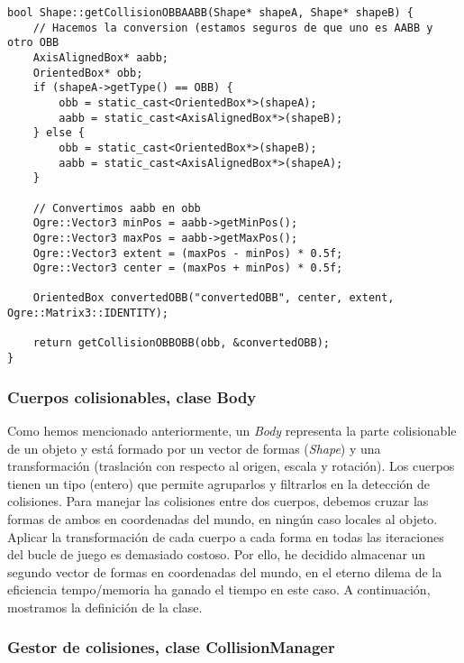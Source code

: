 
\begin{lstlisting}[style=C++]
bool Shape::getCollisionOBBAABB(Shape* shapeA, Shape* shapeB) {
    // Hacemos la conversion (estamos seguros de que uno es AABB y otro OBB
    AxisAlignedBox* aabb;
    OrientedBox* obb;
    if (shapeA->getType() == OBB) {
        obb = static_cast<OrientedBox*>(shapeA);
        aabb = static_cast<AxisAlignedBox*>(shapeB);
    } else {
        obb = static_cast<OrientedBox*>(shapeB);
        aabb = static_cast<AxisAlignedBox*>(shapeA);
    }

    // Convertimos aabb en obb
    Ogre::Vector3 minPos = aabb->getMinPos();
    Ogre::Vector3 maxPos = aabb->getMaxPos();
    Ogre::Vector3 extent = (maxPos - minPos) * 0.5f;
    Ogre::Vector3 center = (maxPos + minPos) * 0.5f;

    OrientedBox convertedOBB("convertedOBB", center, extent, Ogre::Matrix3::IDENTITY);

    return getCollisionOBBOBB(obb, &convertedOBB);
}
\end{lstlisting}

\subsubsection{Cuerpos colisionables, clase Body}

Como hemos mencionado anteriormente, un \textit{Body} representa la parte
colisionable de un objeto y está formado por un vector de formas (\textit{Shape})
y una transformación (traslación con respecto al origen, escala y rotación).
Los cuerpos tienen un tipo (entero) que permite agruparlos y filtrarlos en
la detección de colisiones. Para manejar las colisiones entre dos cuerpos,
debemos cruzar las formas de ambos en coordenadas del mundo, en ningún
caso locales al objeto. Aplicar la transformación de cada cuerpo a cada
forma en todas las iteraciones del bucle de juego es demasiado costoso.
Por ello, he decidido almacenar un segundo vector de formas en coordenadas
del mundo, en el eterno dilema de la eficiencia tempo/memoria ha ganado
el tiempo en este caso. A continuación, mostramos la definición de la clase.\\



\subsubsection{Gestor de colisiones, clase CollisionManager}

